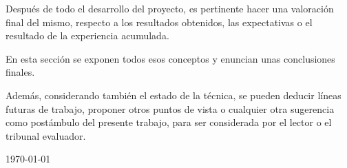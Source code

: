 
  Después de todo el desarrollo del proyecto, es pertinente hacer una valoración final del mismo, respecto a los resultados obtenidos, las expectativas o el resultado de la experiencia acumulada.

  En esta sección se exponen todos esos conceptos y enuncian unas conclusiones finales.
  
  Además, considerando también el estado de la técnica, se pueden deducir líneas futuras de trabajo, proponer otros puntos de vista o cualquier otra sugerencia como postámbulo del presente trabajo, para ser considerada por el lector o el tribunal evaluador.

\begin{flushright}
{\large \pfcauthorname}\nli
\today
\end{flushright}
  
\chapterend
